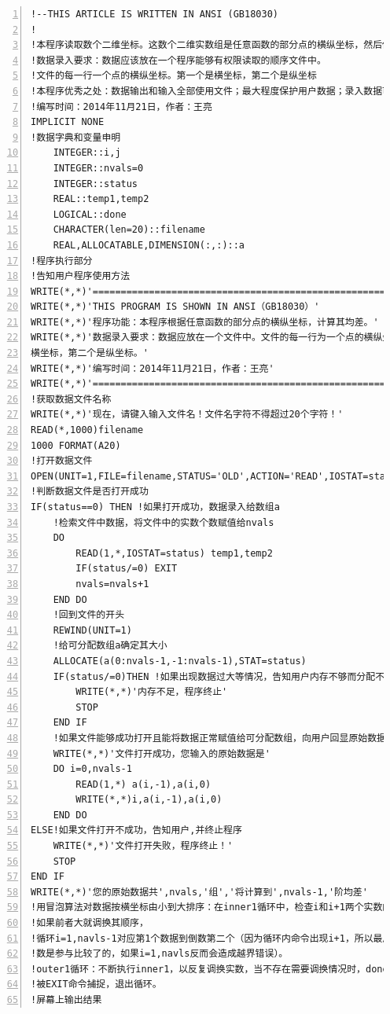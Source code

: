 \documentclass[hyperref,UTF-8]{ctexart}
\begin{document}
\begin{Verbatim}[numbers=left,commandchars=\\\{\},fontsize=\small]
!--THIS ARTICLE IS WRITTEN IN ANSI (GB18030)
!
!本程序读取数个二维坐标。这数个二维实数组是任意函数的部分点的横纵坐标，然后依据这些坐标，求其均差
!数据录入要求：数据应该放在一个程序能够有权限读取的顺序文件中。
!文件的每一行一个点的横纵坐标。第一个是横坐标，第二个是纵坐标
!本程序优秀之处：数据输出和输入全部使用文件；最大程度保护用户数据；录入数据可不按照大小顺序录入
!编写时间：2014年11月21日，作者：王亮
IMPLICIT NONE
!数据字典和变量申明
	INTEGER::i,j
	INTEGER::nvals=0
	INTEGER::status
	REAL::temp1,temp2
	LOGICAL::done
	CHARACTER(len=20)::filename
	REAL,ALLOCATABLE,DIMENSION(:,:)::a
!程序执行部分
!告知用户程序使用方法
WRITE(*,*)'==================================================================='
WRITE(*,*)'THIS PROGRAM IS SHOWN IN ANSI（GB18030）'
WRITE(*,*)'程序功能：本程序根据任意函数的部分点的横纵坐标，计算其均差。'
WRITE(*,*)'数据录入要求：数据应放在一个文件中。文件的每一行为一个点的横纵坐标。第一个是&
横坐标，第二个是纵坐标。'
WRITE(*,*)'编写时间：2014年11月21日，作者：王亮'
WRITE(*,*)'==================================================================='
!获取数据文件名称
WRITE(*,*)'现在，请键入输入文件名！文件名字符不得超过20个字符！'
READ(*,1000)filename
1000 FORMAT(A20)
!打开数据文件
OPEN(UNIT=1,FILE=filename,STATUS='OLD',ACTION='READ',IOSTAT=status)
!判断数据文件是否打开成功
IF(status==0) THEN !如果打开成功，数据录入给数组a
	!检索文件中数据，将文件中的实数个数赋值给nvals
	DO
		READ(1,*,IOSTAT=status) temp1,temp2
		IF(status/=0) EXIT
		nvals=nvals+1
	END DO
	!回到文件的开头
	REWIND(UNIT=1)
	!给可分配数组a确定其大小
	ALLOCATE(a(0:nvals-1,-1:nvals-1),STAT=status)
	IF(status/=0)THEN !如果出现数据过大等情况，告知用户内存不够而分配不成功，程序终止
		WRITE(*,*)'内存不足，程序终止'
		STOP
	END IF
	!如果文件能够成功打开且能将数据正常赋值给可分配数组，向用户回显原始数据
	WRITE(*,*)'文件打开成功，您输入的原始数据是'
	DO i=0,nvals-1
		READ(1,*) a(i,-1),a(i,0)
		WRITE(*,*)i,a(i,-1),a(i,0)
	END DO
ELSE!如果文件打开不成功，告知用户,并终止程序
	WRITE(*,*)'文件打开失败，程序终止！'
	STOP
END IF
WRITE(*,*)'您的原始数据共',nvals,'组','将计算到',nvals-1,'阶均差'
!用冒泡算法对数据按横坐标由小到大排序：在inner1循环中，检查i和i+1两个实数的大小，
!如果前者大就调换其顺序，
!循环i=1,navls-1对应第1个数据到倒数第二个（因为循环内命令出现i+1，所以最后一个
!数是参与比较了的，如果i=1,navls反而会造成越界错误）。
!outer1循环：不断执行inner1，以反复调换实数，当不存在需要调换情况时，done变量将保持真，
!被EXIT命令捕捉，退出循环。
!屏幕上输出结果

\end{Verbatim}
\end{document}
